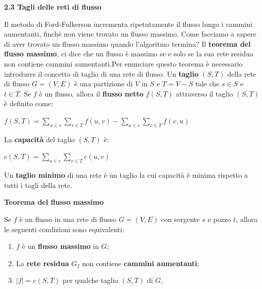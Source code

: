 \documentclass{article}
\begin{document}
\begin{flushleft}
\begin{Large} \textbf{2.3 Tagli delle reti di flusso} \end{Large}
\newline
\newline
Il metodo di Ford-Fulkerson incrementa ripetutamente il flusso lungo i cammini aumentanti, finchè non viene trovato un flusso massimo. Come facciamo a sapere di aver trovato un flusso massimo quando l'algoritmo termina? Il \textbf{teorema del flusso massimo}, ci dice che un flusso è massimo se e solo se la sua rete residua non contiene cammini aumentanti.Per enunciare questo teorema è necessario introdurre il concetto di taglio di una rete di flusso.
\newline
Un \textbf{taglio} $(S, T)$ della rete di flusso $G = (V, E)$ è una partizione di $V$ in $S$ e $T = V - S$ tale che $s \in S$ e $t \in T$.
\newline
Se $f$ è un flusso, allora il \textbf{flusso netto} $f(S, T)$ attraverso il taglio $(S, T)$ è definito come:
\newline
\newline
\begin{center}
$f(S, T) =  \sum\limits_{u \in s} \sum\limits_{v \in T} f(u,v) -  \sum\limits_{u \in s} \sum\limits_{v \in T} f(v,u)$
\newline
\end{center}
La \textbf{capacità} del taglio $(S,T)$ è:
\newline
\newline
\begin{center}
$c(S, T) =  \sum\limits_{u \in s} \sum\limits_{v \in T} c(u,v)$
\newline
\end{center}
Un \textbf{taglio minimo} di una rete è un taglio la cui capacità è minima rispetto a tutti i tagli della rete.
\newline
\newline
\begin{large}\textbf{Teorema del flusso massimo}\end{large}
\newline
\newline
Se $f$ è un flusso in una rete di flusso $G = (V, E)$ con sorgente $s$ e pozzo $t$, allora le seguenti condizioni sono equivalenti:
\begin{enumerate} 
\item $f$ è un \textbf{flusso massimo} in $G$;
\item La \textbf{rete residua} $G_f$ non contiene \textbf{cammini aumentanti};
\item $|f| = c(S, T)$ per qualche taglio $(S, T)$ di $G$,

\end{enumerate}
\end{flushleft}
\end{document}
